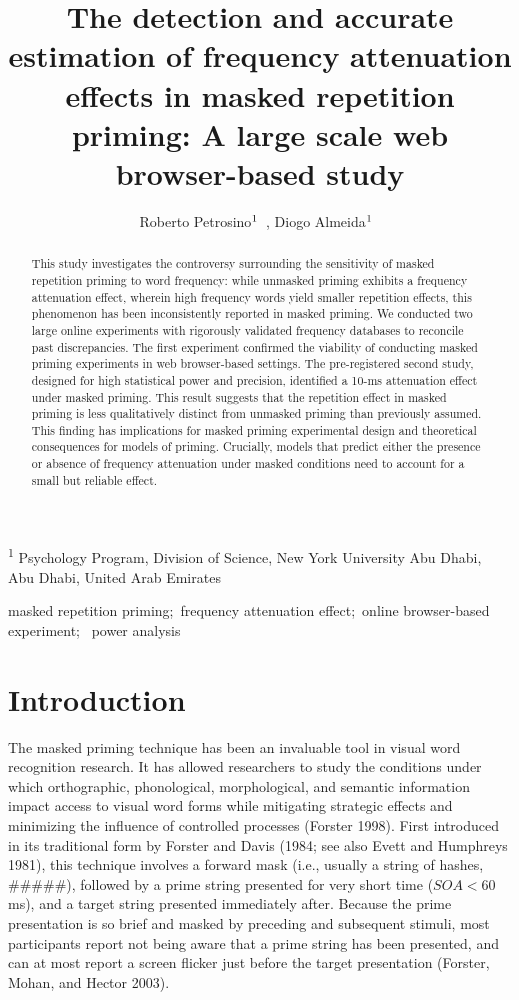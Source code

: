\documentclass[
]{interact}
\title{The detection and accurate estimation of frequency attenuation
effects in masked repetition priming: A large scale web browser-based
study}
\author{Roberto
Petrosino$\textsuperscript{1}$~\orcidlink{0000-0002-8502-3070}, Diogo
Almeida$\textsuperscript{1}$~\orcidlink{0000-0003-4674-8092}}
\begin{document}
\captionsetup{labelsep=space}
\maketitle
\textsuperscript{1} Psychology Program, Division of Science, New York
University Abu Dhabi, Abu Dhabi, United Arab Emirates
\begin{abstract}
This study investigates the controversy surrounding the sensitivity of
masked repetition priming to word frequency: while unmasked priming
exhibits a frequency attenuation effect, wherein high frequency words
yield smaller repetition effects, this phenomenon has been
inconsistently reported in masked priming. We conducted two large online
experiments with rigorously validated frequency databases to reconcile
past discrepancies. The first experiment confirmed the viability of
conducting masked priming experiments in web browser-based settings. The
pre-registered second study, designed for high statistical power and
precision, identified a 10-ms attenuation effect under masked priming.
This result suggests that the repetition effect in masked priming is
less qualitatively distinct from unmasked priming than previously
assumed. This finding has implications for masked priming experimental
design and theoretical consequences for models of priming. Crucially,
models that predict either the presence or absence of frequency
attenuation under masked conditions need to account for a small but
reliable effect.
\end{abstract}
\begin{keywords}
\def\sep{;\ }
masked repetition priming\sep frequency attenuation effect\sep online
browser-based experiment\sep 
power analysis
\end{keywords}

\section{Introduction}\label{sec-intro}

The masked priming technique has been an invaluable tool in visual word
recognition research. It has allowed researchers to study the conditions
under which orthographic, phonological, morphological, and semantic
information impact access to visual word forms while mitigating
strategic effects and minimizing the influence of controlled processes
(Forster 1998). First introduced in its traditional form by Forster and
Davis (1984; see also Evett and Humphreys 1981), this technique involves
a forward mask (i.e., usually a string of hashes, \#\#\#\#\#), followed
by a prime string presented for very short time (\(SOA < 60\) ms), and a
target string presented immediately after. Because the prime
presentation is so brief and masked by preceding and subsequent stimuli,
most participants report not being aware that a prime string has been
presented, and can at most report a screen flicker just before the
target presentation (Forster, Mohan, and Hector 2003).
\end{document}
